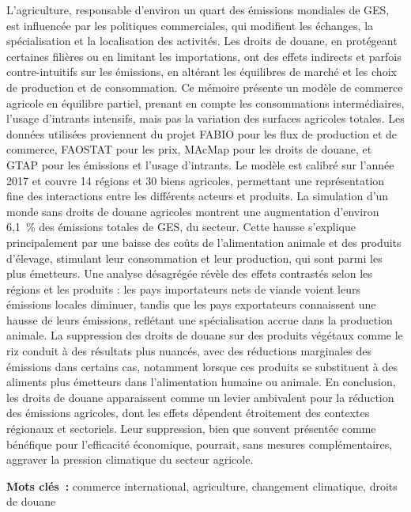 L’agriculture, responsable d’environ un quart des émissions mondiales de GES, est influencée par les politiques commerciales, qui modifient les échanges, la spécialisation et la localisation des activités. Les droits de douane, en protégeant certaines filières ou en limitant les importations, ont des effets indirects et parfois contre-intuitifs sur les émissions, en altérant les équilibres de marché et les choix de production et de consommation. Ce mémoire présente un modèle de commerce agricole en équilibre partiel, prenant en compte les consommations intermédiaires, l'usage d'intrants intensifs, mais pas la variation des surfaces agricoles totales. Les données utilisées proviennent du projet FABIO pour les flux de production et de commerce, FAOSTAT pour les prix, MAcMap pour les droits de douane, et GTAP pour les émissions et l’usage d’intrants. Le modèle est calibré sur l’année 2017 et couvre 14 régions et 30 biens agricoles, permettant une représentation fine des interactions entre les différents acteurs et produits. La simulation d'un monde sans droits de douane agricoles montrent une augmentation d’environ 6,1~\% des émissions totales de GES, du secteur. Cette hausse s’explique principalement par une baisse des coûts de l’alimentation animale et des produits d’élevage, stimulant leur consommation et leur production, qui sont parmi les plus émetteurs. Une analyse désagrégée révèle des effets contrastés selon les régions et les produits : les pays importateurs nets de viande voient leurs émissions locales diminuer, tandis que les pays exportateurs connaissent une hausse de leurs émissions, reflétant une spécialisation accrue dans la production animale. La suppression des droits de douane sur des produits végétaux comme le riz conduit à des résultats plus nuancés, avec des réductions marginales des émissions dans certains cas, notamment lorsque ces produits se substituent à des aliments plus émetteurs dans l’alimentation humaine ou animale. En conclusion, les droits de douane apparaissent comme un levier ambivalent pour la réduction des émissions agricoles, dont les effets dépendent étroitement des contextes régionaux et sectoriels. Leur suppression, bien que souvent présentée comme bénéfique pour l’efficacité économique, pourrait, sans mesures complémentaires, aggraver la pression climatique du secteur agricole.

\textbf{Mots clés~:} commerce international, agriculture, changement climatique, droits de douane
